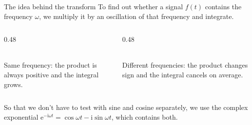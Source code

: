 \documentclass[11pt,aspectratio=169]{beamer}
\newcommand{\ii}{\mathrm{i}}
\newcommand{\e}{\mathrm{e}}
\begin{document}
\begin{frame}{The idea behind the transform}
  To find out whether a signal $f(t)$ contains the frequency $\omega$, we multiply it by an
  oscillation of that frequency and integrate.
  \begin{columns}[c]
    \begin{column}{0.48\textwidth}
      \centering
      \\
      {\small Same frequency: the product is always positive and the integral grows.}
    \end{column}
    \begin{column}{0.48\textwidth}
      \centering
      \\
      {\small Different frequencies: the product changes sign and the integral cancels on average.}
    \end{column}
  \end{columns}
  \vspace{3mm}
  So that we don't have to test with sine and cosine separately, we use the complex
  exponential $\e^{-\ii\omega t}=\cos\omega t-\ii\sin\omega t$, which contains both.
\end{frame}
\end{document}
